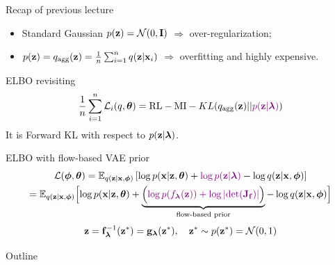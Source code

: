 \begin{frame}{Recap of previous lecture}
	\begin{itemize}
		\item Standard Gaussian $p(\mathbf{z}) = \mathcal{N}(0, \mathbf{I})$ $\Rightarrow$ over-regularization;
		\item $p(\mathbf{z}) = q_{\text{agg}}(\mathbf{z}) = \frac{1}{n}\sum_{i=1}^n q(\mathbf{z} | \mathbf{x}_i)$ $\Rightarrow$ overfitting and highly expensive.
	\end{itemize}
	\begin{block}{ELBO revisiting}
		\vspace{-0.4cm}
		\[
		\frac{1}{n}\sum_{i=1}^n \mathcal{L}_i(q, \boldsymbol{\theta}) = \text{RL} - \text{MI} -  KL(q_{\text{agg}}(\mathbf{z}) || {\color{violet}p(\mathbf{z} | \boldsymbol{\lambda})})
		\]
		It is Forward KL with respect to $p(\mathbf{z} | \boldsymbol{\lambda})$.
	\end{block}
	\begin{block}{ELBO with flow-based VAE prior}
		\vspace{-0.6cm}
		{\small
			\begin{multline*}
				\mathcal{L}(\boldsymbol{\phi}, \boldsymbol{\theta}) = \mathbb{E}_{q(\mathbf{z} | \mathbf{x}, \boldsymbol{\phi})} \left[ \log p(\mathbf{x} | \mathbf{z}, \boldsymbol{\theta}) + {\color{violet}\log p(\mathbf{z} | \boldsymbol{\lambda})} - \log q(\mathbf{z} | \mathbf{x}, \boldsymbol{\phi}) \right] \\
				= \mathbb{E}_{q(\mathbf{z} | \mathbf{x}, \boldsymbol{\phi})} \Bigl[ \log p(\mathbf{x} | \mathbf{z}, \boldsymbol{\theta}) + \underbrace{ \Bigl({\color{violet} \log p(f_{\boldsymbol{\lambda}}(\mathbf{z})) + \log \left| \det (\mathbf{J}_{\mathbf{f}}) \right|} \Bigr) }_{\text{flow-based prior}} - \log q(\mathbf{z} | \mathbf{x}, \boldsymbol{\phi}) \Bigr] 
			\end{multline*}
		}
		\vspace{-0.5cm}
		\[
			\mathbf{z} = \mathbf{f}^{-1}_{\boldsymbol{\lambda}}(\mathbf{z}^*) = \mathbf{g}_{\boldsymbol{\lambda}}(\mathbf{z}^*), \quad \mathbf{z}^* \sim p(\mathbf{z}^*) = \mathcal{N}(0, 1)
		\]
	\end{block}
	\vspace{-0.5cm}
\end{frame}
\begin{frame}{Outline}
	\tableofcontents
\end{frame}
